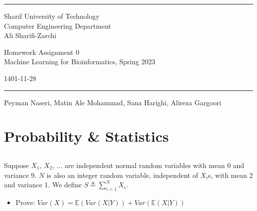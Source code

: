 \documentclass[a4paper]{article}
\begin{document}
	
	
	\fancyhead[C]{}
	\hrule \medskip %
	\begin{minipage}{0.295\textwidth} 
		\raggedright
		\footnotesize
		  Sharif University of Technology \hfill\\   
		Computer Engineering Department\hfill\\
		Ali Sharifi-Zarchi
	\end{minipage}
	\begin{minipage}{0.4\textwidth} 
		\centering 
		\large 
		Homework Assignment 0\\ 
		\normalsize 
		Machine Learning for Bioinformatics, Spring 2023\\ 
	\end{minipage}
	\begin{minipage}{0.295\textwidth} 
		\raggedleft
		\small
            1401-11-28
            \hfill\\
	\end{minipage}
	\medskip\hrule 
	\bigskip
	

        \begin{center}
            Peyman Naseri, Matin Ale Mohammad, Sana Harighi, Alireza Gargoori
        \end{center}
        
        \section{Probability \& Statistics}

        \subsection{}
        Suppose $X_{1}$, $X_{2}$, ... are independent normal random variables with mean 0 and variance 9. $N$ is also an integer random variable, independent of $X_{i}$s, with mean 2 and variance 1. We define
        $S \triangleq  \sum_{i=1}^{N} X_{i}$.
        \begin{itemize}
        \item Prove: $Var(X)=\mathbb{E}(Var(X|Y))+Var(\mathbb{E}(X|Y))$
        \end{itemize}
        
\end{document}
